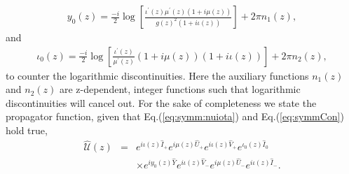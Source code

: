 \documentclass[9pt,twocolumn,twoside]{osajnl}
\begin{document}
\begin{eqnarray}\label{eq:sndlastEq}
	y_0(z)=\frac{-i}{2} \log\left[\frac{\iota^\prime(z) \mu^\prime(z)(1+i\mu(z))}{g(z)^2(1+i\iota(z))}\right] +2 \pi n_1(z), 
\end{eqnarray}
and
\begin{eqnarray}\label{eq:lastEq}
\iota_0(z)=\frac{-i}{2} \log\left[\frac{\iota^\prime(z)}{ \mu^\prime(z)}(1+i\mu(z))(1+i\iota(z))\right]+2 \pi n_2(z), 
\end{eqnarray}
to counter the logarithmic discontinuities. 
Here the auxiliary functions $n_1(z)$ and $n_2(z)$ are z-dependent, integer functions such that logarithmic discontinuities will cancel out.
For the sake of completeness we state the propagator function,
given that Eq.(\ref{eq:symm:nuiota}) and Eq.(\ref{eq:symmCon}) hold true,
\begin{eqnarray}
\hat{\mathcal{U}}(z) &=& e^{i \iota(z) \hat{I}_{+}} e^{i \mu(z) \hat{U}_{+}}  
e^{i \iota(z) \hat{V}_{+}} e^{ \iota_{0}(z) \hat{I}_{0}} \nonumber \\ 
&& \times e^{i y_{0}(z) \hat{Y}}  e^{i \iota(z) \hat{V}_{-}} e^{i \mu(z) \hat{U}_{-}} e^{i \iota(z) \hat{I}_{-}}.
\end{eqnarray}
\end{document}
